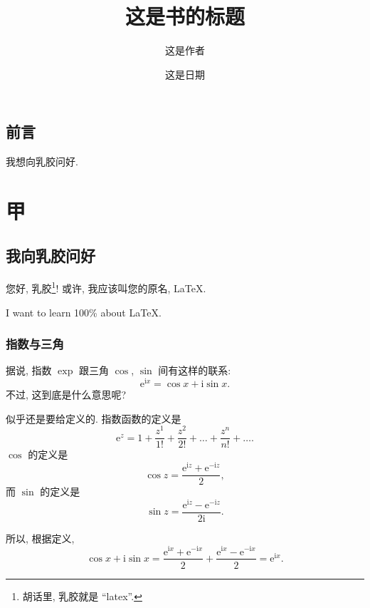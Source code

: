 \documentclass[fontset=fandol]{ctexbook}
\title{这是书的标题}
\author{这是作者}
\date{这是日期}
\begin{document}

\frontmatter

\maketitle

\tableofcontents

\listoftables

\chapter{前言}

我想向乳胶问好.

\mainmatter

\part{甲}

\chapter{我向乳胶问好}

您好, 乳胶\footnote{胡话里, 乳胶就是 ``latex''.}!
或许, 我应该叫您的原名, \LaTeX{}.

I want%
    to learn
        100\% about \LaTeX{}.

\section{指数与三角}

据说, 指数 $\exp$ 跟三角 $\cos$, $\sin$ 间有这样的联系:
\begin{equation}\label{eq:Euler}
    \mathrm{e}^{\mathrm{i} x} = \cos {x} + \mathrm{i} \sin {x}.
\end{equation}
不过, 这到底是什么意思呢?

似乎还是要给定义的.
指数函数的定义是
\[
    \mathrm{e}^{z} = 1 + \frac{z^1}{1!} + \frac{z^2}{2!}
    + \dots + \frac{z^n}{n!} + \dots.
\]
$\cos$ 的定义是
\[
    \cos {z}
    = \frac{\mathrm{e}^{\mathrm{i} z}
    + \mathrm{e}^{-\mathrm{i} z}}{2},
\]
而 $\sin$ 的定义是
\[
    \sin {z}
    = \frac{\mathrm{e}^{\mathrm{i} z}
    - \mathrm{e}^{-\mathrm{i} z}}{2\mathrm{i}}.
\]

所以, 根据定义,
\[
    \cos {x} + \mathrm{i} \sin {x}
    = \frac{\mathrm{e}^{\mathrm{i} x}
    + \mathrm{e}^{-\mathrm{i} x}}{2}
    + \frac{\mathrm{e}^{\mathrm{i} x}
    - \mathrm{e}^{-\mathrm{i} x}}{2}
    = \mathrm{e}^{\mathrm{i} x}.
\]
\end{document}
